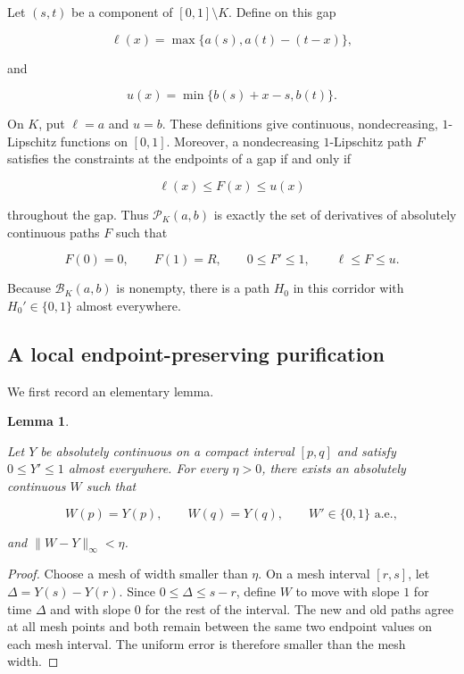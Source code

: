 \documentclass[11pt]{article}
\newtheorem{lemma}[theorem]{Lemma}
\numberwithin{equation}{section}
\begin{document}
Let $(s,t)$ be a component of $[0,1]\setminus K$. Define on this gap

\nopagebreak[4]
\[
\ell(x)=\max\{a(s),a(t)-(t-x)\},
\]

and

\nopagebreak[4]
\[
u(x)=\min\{b(s)+x-s,b(t)\}.
\]

On $K$, put $\ell=a$ and $u=b$. These definitions give continuous, nondecreasing,
$1$-Lipschitz functions on $[0,1]$. Moreover, a nondecreasing $1$-Lipschitz path $F$
satisfies the constraints at the endpoints of a gap if and only if

\nopagebreak[4]
\[
\ell(x)\le F(x)\le u(x)
\]

throughout the gap. Thus $\mathcal P_K(a,b)$ is exactly the set of derivatives of
absolutely continuous paths $F$ such that

\nopagebreak[4]
\[
F(0)=0,\qquad F(1)=R,\qquad
0\le F'\le1,\qquad \ell\le F\le u.
\]

Because $\mathcal B_K(a,b)$ is nonempty, there is a path $H_0$ in this corridor with
$H_0'\in\{0,1\}$ almost everywhere.

\subsection{A local endpoint-preserving purification}


We first record an elementary lemma.

\begin{lemma}
\label{lem:local-purification}

Let $Y$ be absolutely continuous on a compact interval $[p,q]$ and satisfy
$0\le Y'\le1$ almost everywhere. For every $\eta>0$, there exists an absolutely
continuous $W$ such that

\nopagebreak[4]
\[
W(p)=Y(p),\qquad W(q)=Y(q),\qquad W'\in\{0,1\}\text{ a.e.},
\]

and $\|W-Y\|_\infty<\eta$.

\end{lemma}

\begin{proof}

Choose a mesh of width smaller than $\eta$. On a mesh interval $[r,s]$, let
$\Delta=Y(s)-Y(r)$. Since $0\le\Delta\le s-r$, define $W$ to move with slope $1$
for time $\Delta$ and with slope $0$ for the rest of the interval. The new and old
paths agree at all mesh points and both remain between the same two endpoint values on
each mesh interval. The uniform error is therefore smaller than the mesh width.
\end{proof}
\end{document}

